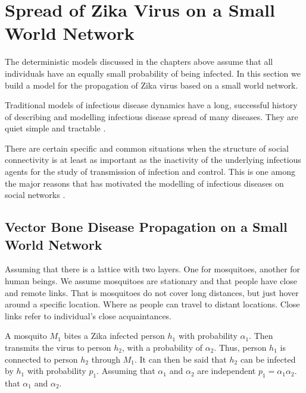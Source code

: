\chapter{ Spread of Zika Virus on a Small World Network }

The deterministic models discussed in the chapters above assume that all individuals have an equally small probability of being infected. In this section we build a model for the propagation of Zika virus based on a small world network.

Traditional models of infectious disease dynamics have a long, successful history of describing and modelling infectious disease spread of many diseases. They are quiet simple and tractable \citep{fu2013propagation}.

There are certain specific and common situations when the structure of social connectivity is at least as important as the inactivity
of the underlying infectious agents for the study of transmission of infection and control. This is one among the major reasons that has motivated the modelling of infectious diseases on social networks \cite{fu2013propagation}.



\section{ Vector Bone Disease Propagation on a Small World Network}

Assuming that there is a lattice with two layers.
One for mosquitoes, another for human beings. We assume mosquitoes are stationary and that people have close and remote links. That is mosquitoes do not cover long distances, but just hover around a specific location.
Where as people can travel to distant locations. Close links refer to individual's close acquaintances.
 
A mosquito $M_1$ bites a Zika infected person $h_1$ with probability $\alpha_1$. Then transmits the virus to person $h_2$, with a probability of $\alpha_2$. Thus, person $h_1$ is connected to  person $h_2$ through $M_1$. It can then be said that $h_2$ can be infected by $h_1$ with probability $p_1$. Assuming that $\alpha_1 $ and $\alpha_2$ are independent  $p_1 =  \alpha_1 \alpha_2$. 
that $\alpha_1$ and $\alpha_2$.


